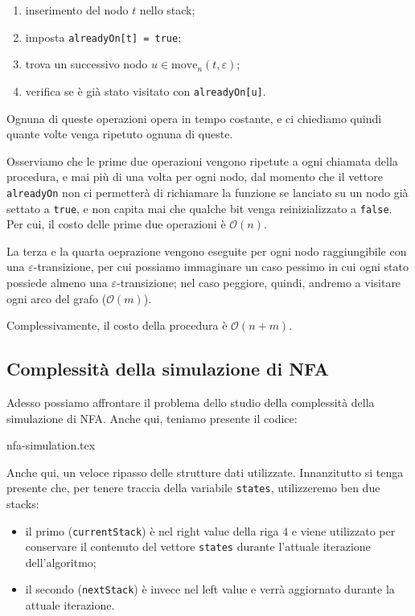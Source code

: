 \documentclass[class=book, crop=false, oneside, 12pt]{standalone}
\begin{document}
\begin{enumerate}
    \item inserimento del nodo \(t\) nello stack;
    \item imposta \texttt{alreadyOn[t] = true};
    \item trova un successivo nodo \(u \in \textrm{move}_n(t, \varepsilon)\);
    \item verifica se è già stato visitato con \texttt{alreadyOn[u]}.
\end{enumerate}

\noindent Ognuna di queste operazioni opera in tempo costante, e ci chiediamo quindi quante volte venga ripetuto ognuna di queste.

Osserviamo che le prime due operazioni vengono ripetute a ogni chiamata della procedura, e mai più di una volta per ogni nodo, dal momento che il vettore \texttt{alreadyOn} non ci permetterà di richiamare la funzione se lanciato su un nodo già settato a \texttt{true}, e non capita mai che qualche bit venga reinizializzato a \texttt{false}. Per cui, il costo delle prime due operazioni è \(\mathcal{O}(n)\).

La terza e la quarta oeprazione vengono eseguite per ogni nodo raggiungibile con una \(\varepsilon\)-transizione, per cui possiamo immaginare un caso pessimo in cui ogni stato possiede almeno una \(\varepsilon\)-transizione; nel caso peggiore, quindi, andremo a visitare ogni arco del grafo (\(\mathcal{O}(m)\)).

Complessivamente, il costo della procedura è \(\mathcal{O}(n + m)\).

\subsection{Complessità della simulazione di NFA}
Adesso possiamo affrontare il problema dello studio della complessità della simulazione di NFA. Anche qui, teniamo presente il codice:

{nfa-simulation.tex}

\noindent Anche qui, un veloce ripasso delle strutture dati utilizzate. Innanzitutto si tenga presente che, per tenere traccia della variabile \texttt{states}, utilizzeremo ben due stacks:

\begin{itemize}
    \item il primo (\texttt{currentStack}) è nel right value della riga \(4\) e viene utilizzato per conservare il contenuto del vettore \texttt{states} durante l'attuale iterazione dell'algoritmo;
    \item il secondo (\texttt{nextStack}) è invece  nel left value e verrà aggiornato durante la attuale iterazione.
\end{itemize}
\end{document}
